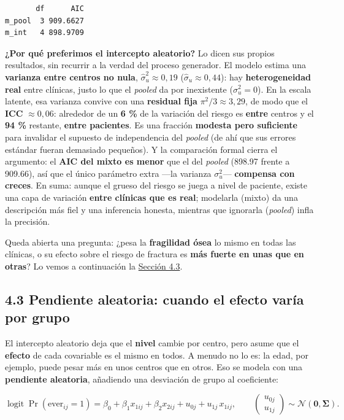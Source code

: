 \documentclass[
  letterpaper,
  DIV=11,
  numbers=noendperiod]{scrartcl}
\begin{document}
\begin{verbatim}
       df      AIC
m_pool  3 909.6627
m_int   4 898.9709
\end{verbatim}

\textbf{¿Por qué preferimos el intercepto aleatorio?} Lo dicen sus
propios resultados, sin recurrir a la verdad del proceso generador. El
modelo estima una \textbf{varianza entre centros no nula},
\(\hat\sigma_u^2\approx0{,}19\) (\(\hat\sigma_u\approx0{,}44\)): hay
\textbf{heterogeneidad real} entre clínicas, justo lo que el
\emph{pooled} da por inexistente (\(\sigma_u^2=0\)). En la escala
latente, esa varianza convive con una \textbf{residual fija}
\(\pi^2/3\approx3{,}29\), de modo que el \textbf{ICC} \(\approx0{,}06\):
alrededor de un \textbf{6 \%} de la variación del riesgo es
\textbf{entre} centros y el \textbf{94 \%} restante, \textbf{entre
pacientes}. Es una fracción \textbf{modesta pero suficiente} para
invalidar el supuesto de independencia del \emph{pooled} (de ahí que sus
errores estándar fueran demasiado pequeños). Y la comparación formal
cierra el argumento: el \textbf{AIC del mixto es menor} que el del
\emph{pooled} (898.97 frente a 909.66), así que el único parámetro extra
---la varianza \(\sigma_u^2\)--- \textbf{compensa con creces}. En suma:
aunque el grueso del riesgo se juega a nivel de paciente, existe una
capa de variación \textbf{entre clínicas que es real}; modelarla (mixto)
da una descripción más fiel y una inferencia honesta, mientras que
ignorarla (\emph{pooled}) infla la precisión.

Queda abierta una pregunta: ¿pesa la \textbf{fragilidad ósea} lo mismo
en todas las clínicas, o su efecto sobre el riesgo de fractura es
\textbf{más fuerte en unas que en otras}? Lo vemos a continuación la
\protect\hyperlink{sec-u14-pendiente}{Sección 4.3}.

\hypertarget{sec-u14-pendiente}{%
\subsection{4.3 Pendiente aleatoria: cuando el efecto varía por
grupo}\label{sec-u14-pendiente}}

El intercepto aleatorio deja que el \textbf{nivel} cambie por centro,
pero asume que el \textbf{efecto} de cada covariable es el mismo en
todos. A menudo no lo es: la edad, por ejemplo, puede pesar más en unos
centros que en otros. Eso se modela con una \textbf{pendiente
aleatoria}, añadiendo una desviación de grupo al coeficiente:

\[
\operatorname{logit}\Pr(\text{ever}_{ij}=1)=\beta_0+\beta_1 x_{1ij}+\beta_2 x_{2ij}+u_{0j}+u_{1j}\,x_{1ij},
\qquad
\begin{pmatrix}u_{0j}\\ u_{1j}\end{pmatrix}\sim\mathcal{N}(\mathbf{0},\boldsymbol\Sigma).
\]
\end{document}
